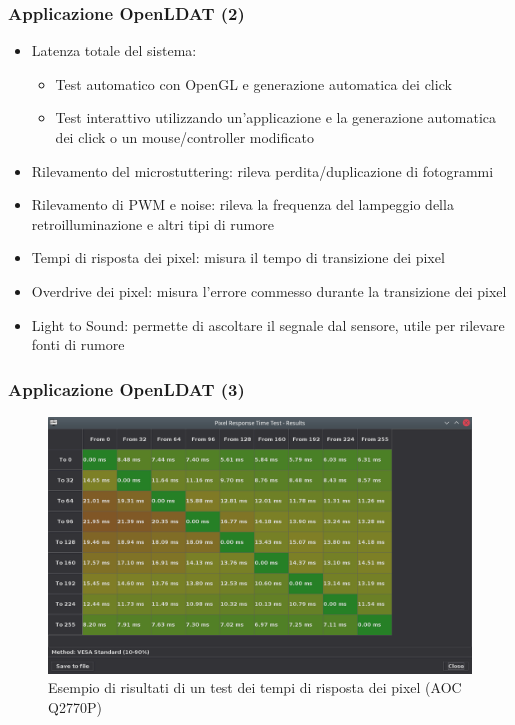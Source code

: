 \documentclass[xcolor={x11names}]{beamer}
\begin{document}
\begin{frame}[shrink=7]
	\frametitle{Applicazione OpenLDAT (2)}
	\begin{itemize}
		\item \alert{Latenza totale del sistema}:\begin{itemize}
			\item \alert{Test automatico} con OpenGL e generazione automatica dei click
			\item \alert{Test interattivo} utilizzando un'applicazione e la generazione automatica dei click o un mouse/controller modificato
		\end{itemize}
		\item \alert{Rilevamento del microstuttering}: rileva perdita/duplicazione di fotogrammi
		\item \alert{Rilevamento di PWM e noise}: rileva la frequenza del lampeggio della retroilluminazione e altri tipi di rumore
		\item \alert{Tempi di risposta dei pixel}: misura il tempo di transizione dei pixel
		\item \alert{Overdrive dei pixel}: misura l'errore commesso durante la transizione dei pixel
		\item \alert{Light to Sound}: permette di ascoltare il segnale dal sensore, utile per rilevare fonti di rumore
	\end{itemize}
\end{frame}
\begin{frame}[shrink=10]
	\frametitle{Applicazione OpenLDAT (3)}
	\begin{figure}
		\includegraphics[width=\textwidth]{Applicazione_files/gui_pixelresponse_results.png}
		\caption*{Esempio di risultati di un test dei tempi di risposta dei pixel (AOC Q2770P)}
	\end{figure}
\end{frame}
\end{document}
